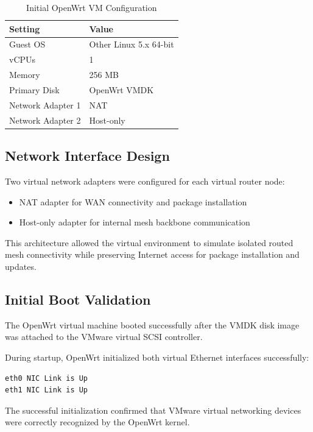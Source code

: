 \documentclass[conference]{IEEEtran}
\begin{document}
\begin{table}[H]
\centering
\caption{Initial OpenWrt VM Configuration}
\begin{tabular}{|l|l|}
\hline
Setting & Value \\ \hline
Guest OS & Other Linux 5.x 64-bit \\ \hline
vCPUs & 1 \\ \hline
Memory & 256 MB \\ \hline
Primary Disk & OpenWrt VMDK \\ \hline
Network Adapter 1 & NAT \\ \hline
Network Adapter 2 & Host-only \\ \hline
\end{tabular}
\end{table}

\subsection{Network Interface Design}

Two virtual network adapters were configured for each virtual router node:

\begin{itemize}
    \item NAT adapter for WAN connectivity and package installation
    \item Host-only adapter for internal mesh backbone communication
\end{itemize}

This architecture allowed the virtual environment to simulate isolated routed mesh connectivity while preserving Internet access for package installation and updates.

\subsection{Initial Boot Validation}

The OpenWrt virtual machine booted successfully after the VMDK disk image was attached to the VMware virtual SCSI controller.

During startup, OpenWrt initialized both virtual Ethernet interfaces successfully:

\begin{lstlisting}
eth0 NIC Link is Up
eth1 NIC Link is Up
\end{lstlisting}

The successful initialization confirmed that VMware virtual networking devices were correctly recognized by the OpenWrt kernel.
\end{document}
